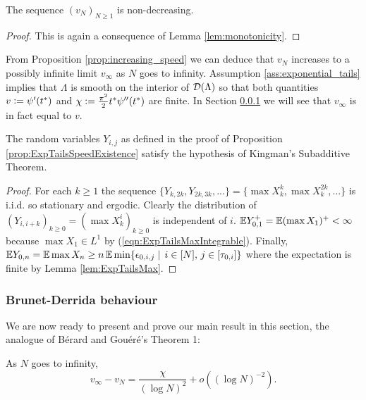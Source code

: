 \begin{proposition}\label{prop:increasing_speed}
The sequence $(v_N)_{N \geq 1}$ is non-decreasing. 
\end{proposition}
\begin{proof}
This is again a consequence of Lemma \ref{lem:monotonicity}. 
\end{proof}

\begin{remark}\label{rem:constants}
From Proposition \ref{prop:increasing_speed} we can deduce that $v_N$ increases to a possibly infinite limit $v_\infty$ as $N$ goes to infinity. Assumption \ref{ass:exponential_tails} implies that $\Lambda$ is smooth on the interior of $\cal{D}(\Lambda)$ so that both quantities $v \defeq \psi'(t^*)$ and $\chi \defeq \frac{\pi^2}{2} t^* \psi''(t^*)$ are finite. In Section \ref{sec:ExpTails_BrunDer} we will see that $v_\infty$ is in fact equal to $v$. 
\end{remark}

\begin{lemma}\label{lem:ExpTailsKingmanHolds}
The random variables $Y_{i,j}$ as defined in the proof of Proposition \ref{prop:ExpTailsSpeedExistence} satisfy the hypothesis of Kingman's Subadditive Theorem. 
\end{lemma}

\begin{proof}
For each $k \geq 1$ the sequence $\{Y_{k, 2k}, Y_{2k, 3k}, ...\} = \{\max X^k_k, \max X^{2k}_k, ... \}$ is i.i.d. so stationary and ergodic. Clearly the distribution of $(Y_{i, i + k})_{k \geq 0} = (\max X^i_k)_{k \geq 0}$ is independent of $i$. $\E Y^+_{0,1} = \E (\max X_1)^+ < \infty$ because $\max X_1 \in L^1$ by (\ref{eqn:ExpTailsMaxIntegrable}). Finally, $\E Y_{0, n} = \E \max X_n \geq n\, \E \min\{\epsilon_{0, i, j} \mid\, i \in [N],\, j \in [\tau_{0, i}]\}$ where the expectation is finite by Lemma \ref{lem:ExpTailsMax}. 
\end{proof}

\subsubsection{Brunet-Derrida behaviour}\label{sec:ExpTails_BrunDer}

We are now ready to present and prove our main result in this section, the analogue of Bérard and Gouéré's Theorem 1:
\begin{theorem}\label{thm:ExpTails_BrunDer}
As $N$ goes to infinity, 
\begin{equation*}
v_\infty - v_N = \frac{\chi}{(\log N)^2} + o((\log N)^{-2}). 
\end{equation*}
\end{theorem}

